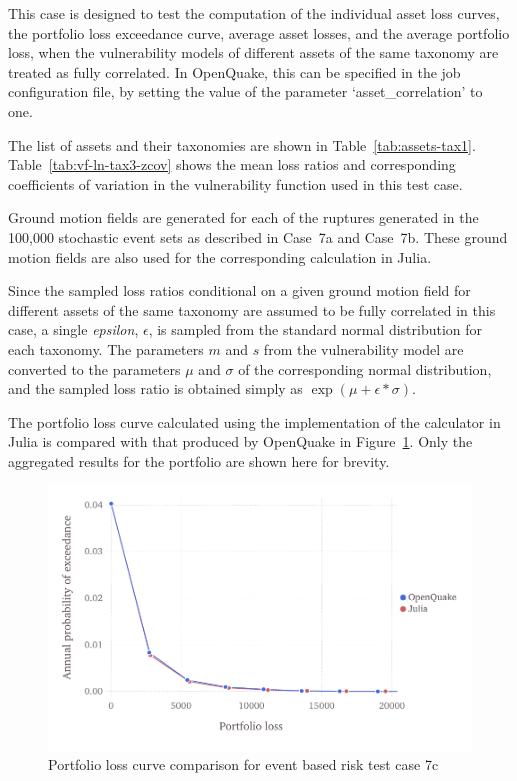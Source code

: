 This case is designed to test the computation of the individual asset loss curves, the portfolio loss exceedance curve, average asset losses, and the average portfolio loss, when the vulnerability models of different assets of the same taxonomy are treated as fully correlated. In OpenQuake, this can be specified in the job configuration file, by setting the value of the parameter `asset\_correlation' to one.

The list of assets and their taxonomies are shown in Table~\ref{tab:assets-tax1}. Table~\ref{tab:vf-ln-tax3-zcov} shows the mean loss ratios and corresponding coefficients of variation in the vulnerability function used in this test case.

Ground motion fields are generated for each of the ruptures generated in the 100,000 stochastic event sets as described in Case~7a and Case~7b. These ground motion fields are also used for the corresponding calculation in Julia.

Since the sampled loss ratios conditional on a given ground motion field for different assets of the same taxonomy are assumed to be fully correlated in this case, a single \emph{epsilon}, $\epsilon$,  is sampled from the standard normal distribution for each taxonomy. The parameters $m$ and $s$ from the vulnerability model are converted to the parameters $\mu$ and $\sigma$ of the corresponding normal distribution, and the sampled loss ratio is obtained simply as $\exp (\mu + \epsilon * \sigma)$.

The portfolio loss curve calculated using the implementation of the calculator in Julia is compared with that produced by OpenQuake in Figure~\ref{fig:lc-ebr-7c}. Only the aggregated results for the portfolio are shown here for brevity.

\begin{figure}[htbp]
\centering
\includegraphics[width=12cm]{qareport/figures/fig-lc-ebr-7c}
\caption{Portfolio loss curve comparison for event based risk test case 7c}
\label{fig:lc-ebr-7c}
\end{figure}